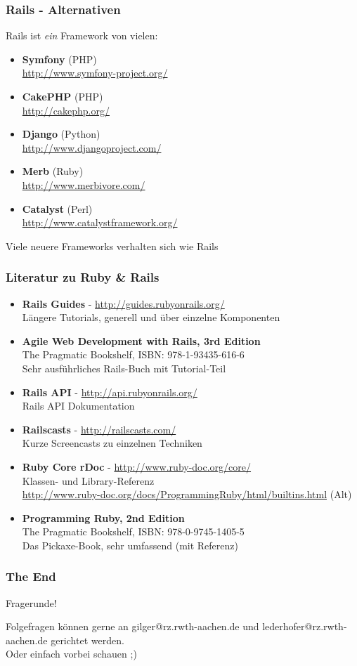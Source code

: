 \begin{frame}
  \frametitle{Rails - Alternativen}
  Rails ist \emph{ein} Framework von vielen:
  \begin{itemize}
    \item {\bf Symfony} (PHP) \\ \url{http://www.symfony-project.org/}
    \item {\bf CakePHP} (PHP) \\ \url{http://cakephp.org/}
    \item {\bf Django} (Python) \\ \url{http://www.djangoproject.com/}
    \item {\bf Merb} (Ruby) \\ \url{http://www.merbivore.com/}
    \item {\bf Catalyst} (Perl) \\ \url{http://www.catalystframework.org/}
  \end{itemize}
  Viele neuere Frameworks verhalten sich wie Rails
\end{frame}

\begin{frame}
  \frametitle{Literatur zu Ruby \& Rails}
  \small
  \begin{itemize}
    \item {\bf Rails Guides} - \url{http://guides.rubyonrails.org/} \\ Längere Tutorials, generell und über einzelne Komponenten
    \item {\bf Agile Web Development with Rails, 3rd Edition} \\ The Pragmatic Bookshelf, ISBN: 978-1-93435-616-6 \\ Sehr ausführliches Rails-Buch mit Tutorial-Teil
    \item {\bf Rails API} - \url{http://api.rubyonrails.org/} \\ Rails API Dokumentation
    \item {\bf Railscasts} - \url{http://railscasts.com/} \\ Kurze Screencasts zu einzelnen Techniken
    \item {\bf Ruby Core rDoc} - \url{http://www.ruby-doc.org/core/} \\ Klassen- und Library-Referenz \\ \url{http://www.ruby-doc.org/docs/ProgrammingRuby/html/builtins.html} (Alt)
    \item {\bf Programming Ruby, 2nd Edition} \\ The Pragmatic Bookshelf, ISBN: 978-0-9745-1405-5 \\ Das Pickaxe-Book, sehr umfassend (mit Referenz)
  \end{itemize}
\end{frame}

\begin{frame}
  \frametitle{The End}
  \begin{center}
    \Huge Fragerunde!
    \vspace{1.5cm}

    \small Folgefragen können gerne an gilger@rz.rwth-aachen.de und lederhofer@rz.rwth-aachen.de gerichtet werden. \\
    Oder einfach vorbei schauen ;)
  \end{center}
\end{frame}


